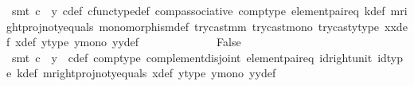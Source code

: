 \begin{isabellebody}
\ {\isacharparenleft}{\kern0pt}smt\ {\isacartoucheopen}c\ {\isasymnoteq}\ y{}{\isacartoucheclose}\ c{\isacharunderscore}{\kern0pt}def\ cfunc{\isacharunderscore}{\kern0pt}type{\isacharunderscore}{\kern0pt}def\ comp{\isacharunderscore}{\kern0pt}associative\ comp{\isacharunderscore}{\kern0pt}type\ element{\isacharunderscore}{\kern0pt}pair{\isacharunderscore}{\kern0pt}eq\ k{\isacharunderscore}{\kern0pt}def\ m{\isacharunderscore}{\kern0pt}rightproj{\isacharunderscore}{\kern0pt}not{\isacharunderscore}{\kern0pt}y{}{\isacharunderscore}{\kern0pt}equals\ monomorphism{\isacharunderscore}{\kern0pt}def{}\ try{\isacharunderscore}{\kern0pt}cast{\isacharunderscore}{\kern0pt}m{\isacharunderscore}{\kern0pt}m{\isacharprime}{\kern0pt}\ try{\isacharunderscore}{\kern0pt}cast{\isacharunderscore}{\kern0pt}mono\ trycast{\isacharunderscore}{\kern0pt}y{}{\isacharunderscore}{\kern0pt}type\ x{}x{}{\isacharunderscore}{\kern0pt}def{\isacharparenleft}{\kern0pt}{}{\isacharparenright}{\kern0pt}\ x{\isacharunderscore}{\kern0pt}def\ y{}{\isacharprime}{\kern0pt}{\isacharunderscore}{\kern0pt}type\ y{}{\isacharunderscore}{\kern0pt}mono\ y{}y{}{\isacharunderscore}{\kern0pt}def{\isacharparenleft}{\kern0pt}{}{\isacharparenright}{\kern0pt}{\isacharparenright}{\kern0pt}\isanewline
\ \ \ \ \ \ \ \ \ \ \isamarkupfalse%
\ \isamarkupfalse%
\ False\isanewline
\ \ \ \ \ \ \ \ \ \ \ \ \isamarkupfalse%
\ {\isacharparenleft}{\kern0pt}smt\ {\isacartoucheopen}c\ {\isasymnoteq}\ y{}{\isacartoucheclose}\ \ c{\isacharunderscore}{\kern0pt}def\ comp{\isacharunderscore}{\kern0pt}type\ complement{\isacharunderscore}{\kern0pt}disjoint\ element{\isacharunderscore}{\kern0pt}pair{\isacharunderscore}{\kern0pt}eq\ id{\isacharunderscore}{\kern0pt}right{\isacharunderscore}{\kern0pt}unit{}\ id{\isacharunderscore}{\kern0pt}type\ k{\isacharunderscore}{\kern0pt}def\ m{\isacharunderscore}{\kern0pt}rightproj{\isacharunderscore}{\kern0pt}not{\isacharunderscore}{\kern0pt}y{}{\isacharunderscore}{\kern0pt}equals\ x{\isacharunderscore}{\kern0pt}def\ y{}{\isacharprime}{\kern0pt}{\isacharunderscore}{\kern0pt}type\ y{}{\isacharunderscore}{\kern0pt}mono\ y{}y{}{\isacharunderscore}{\kern0pt}def{\isacharparenleft}{\kern0pt}{}{\isacharparenright}{\kern0pt}{\isacharparenright}{\kern0pt}\isanewline
\ \ \ \ \ \ \ \ \ \ \isamarkupfalse%
\ \isamarkupfalse%

\end{isabellebody}
